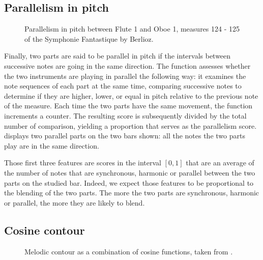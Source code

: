 \documentclass{article}
\begin{document}
\subsection{Parallelism in pitch}


\begin{figure}[ht]
  \centerline{}
  \caption{Parallelism in pitch between Flute 1 and Oboe 1, measures 124 - 125 of the Symphonie Fantastique by Berlioz.}
  \label{fig:parallel}
\end{figure}

Finally, two parts are said to be parallel in pitch if the intervals between successive notes are going in the same direction.
The function assesses whether the two instruments are playing in parallel the following way:
it examines the note sequences of each part at the same time, comparing successive notes to determine if they are higher, lower, or equal in pitch relative to the previous note of the measure.
Each time the two parts have the same movement, the function increments a counter.
The resulting score is subsequently divided by the total number of comparison, yielding a proportion that serves as the parallelism score.
 displays two parallel parts on the two bars shown: all the notes the two parts play are in the same direction.

\hfill

Those first three features are scores in the interval $[0,1]$ that are an average of the number of notes that are synchronous, harmonic or parallel between the two parts on the studied bar.
Indeed, we expect those features to be proportional to the blending of the two parts.
The more the two parts are synchronous, harmonic or parallel, the more they are likely to blend.


\subsection{Cosine contour}


\begin{figure}[ht]
  \centerline{}
  \caption{Melodic contour as a combination of cosine functions, taken from \cite{cornelissen_cosine_2021}.}
  \label{fig:cosine_contour}
\end{figure}
\end{document}
